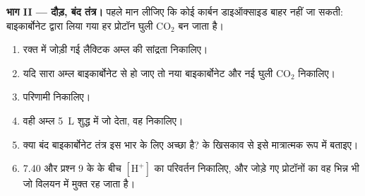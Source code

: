 \begin{problem}
\medskip
\noindent\textbf{भाग II --- दौड़, बंद तंत्र।}
पहले मान लीजिए कि कोई कार्बन डाइऑक्साइड बाहर नहीं जा सकती: बाइकार्बोनेट
द्वारा लिया गया हर प्रोटॉन घुली $\mathrm{CO_2}$ बन जाता है।
\begin{enumerate}[resume]
  \item रक्त में जोड़ी गई लैक्टिक अम्ल की सांद्रता निकालिए।
  \item यदि सारा अम्ल बाइकार्बोनेट से  हो जाए तो नया बाइकार्बोनेट
        और नई घुली $\mathrm{CO_2}$ निकालिए।
  \item परिणामी  निकालिए।
  \item वही अम्ल \qty{5}{L} शुद्ध  में जो  देता, वह निकालिए।
  \item क्या बंद बाइकार्बोनेट तंत्र इस भार के लिए अच्छा  है?  के
        खिसकाव से इसे मात्रात्मक रूप में बताइए।
  \item {} 7.40 और प्रश्न 9 के  के बीच $[\mathrm{H^+}]$ का परिवर्तन
        निकालिए, और जोड़े गए प्रोटॉनों का वह भिन्न भी जो विलयन में
        मुक्त रह जाता है।
\end{enumerate}


\end{problem}
